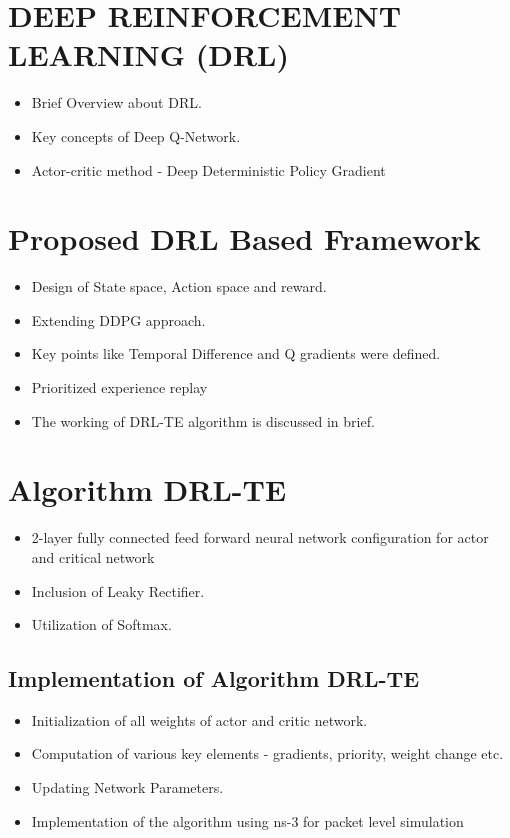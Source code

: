 \section{DEEP REINFORCEMENT LEARNING (DRL)}
\label{sec:relwork}

\begin{itemize}

\item Brief Overview about DRL\cite{v_mnih:_handb_DRL}.

\item Key concepts of Deep Q-Network.

\item Actor-critic method - Deep Deterministic Policy Gradient\cite{leuwen00:_handb_schol}

\end{itemize}

\section{Proposed DRL Based Framework}
\label{sec:Proposed_DRL}
\begin{itemize}

\item Design of State space, Action space and reward.
\item Extending DDPG approach.
\item Key points like Temporal Difference and Q gradients were defined.
\item Prioritized experience replay\cite{Schaul:_replay}
\item The working of DRL-TE algorithm is discussed in brief.
\end{itemize}

\section{Algorithm DRL-TE}
\label{sec:orgheadline1}
\begin{itemize}

\item 2-layer fully connected feed forward neural network configuration for actor and critical network
\item Inclusion of Leaky Rectifier.  
\item Utilization of Softmax.
\end{itemize}

\subsection{Implementation of Algorithm DRL-TE}
\label{sec:orgheadline1}
\begin{itemize}

\item Initialization of all weights of actor and critic network.
\item Computation of various key elements - gradients, priority, weight change etc.
\item Updating Network Parameters.
\item Implementation of the algorithm using ns-3 for packet level simulation
\end{itemize}



